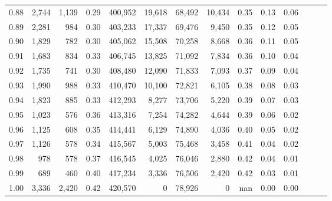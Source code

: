 \begin{tabular}{rrrrrrrrrrrrrr}
0.88 &   2,744 &  1,139 &  0.29 &  400,952 &   19,618 &  68,492 &  10,434 &  0.35 &  0.13 &      0.06 \\
0.89 &   2,281 &    984 &  0.30 &  403,233 &   17,337 &  69,476 &   9,450 &  0.35 &  0.12 &      0.05 \\
0.90 &   1,829 &    782 &  0.30 &  405,062 &   15,508 &  70,258 &   8,668 &  0.36 &  0.11 &      0.05 \\
0.91 &   1,683 &    834 &  0.33 &  406,745 &   13,825 &  71,092 &   7,834 &  0.36 &  0.10 &      0.04 \\
0.92 &   1,735 &    741 &  0.30 &  408,480 &   12,090 &  71,833 &   7,093 &  0.37 &  0.09 &      0.04 \\
0.93 &   1,990 &    988 &  0.33 &  410,470 &   10,100 &  72,821 &   6,105 &  0.38 &  0.08 &      0.03 \\
0.94 &   1,823 &    885 &  0.33 &  412,293 &    8,277 &  73,706 &   5,220 &  0.39 &  0.07 &      0.03 \\
0.95 &   1,023 &    576 &  0.36 &  413,316 &    7,254 &  74,282 &   4,644 &  0.39 &  0.06 &      0.02 \\
0.96 &   1,125 &    608 &  0.35 &  414,441 &    6,129 &  74,890 &   4,036 &  0.40 &  0.05 &      0.02 \\
0.97 &   1,126 &    578 &  0.34 &  415,567 &    5,003 &  75,468 &   3,458 &  0.41 &  0.04 &      0.02 \\
0.98 &     978 &    578 &  0.37 &  416,545 &    4,025 &  76,046 &   2,880 &  0.42 &  0.04 &      0.01 \\
0.99 &     689 &    460 &  0.40 &  417,234 &    3,336 &  76,506 &   2,420 &  0.42 &  0.03 &      0.01 \\
1.00 &   3,336 &  2,420 &  0.42 &  420,570 &        0 &  78,926 &       0 &   nan &  0.00 &      0.00 \\
\bottomrule
\end{tabular}

